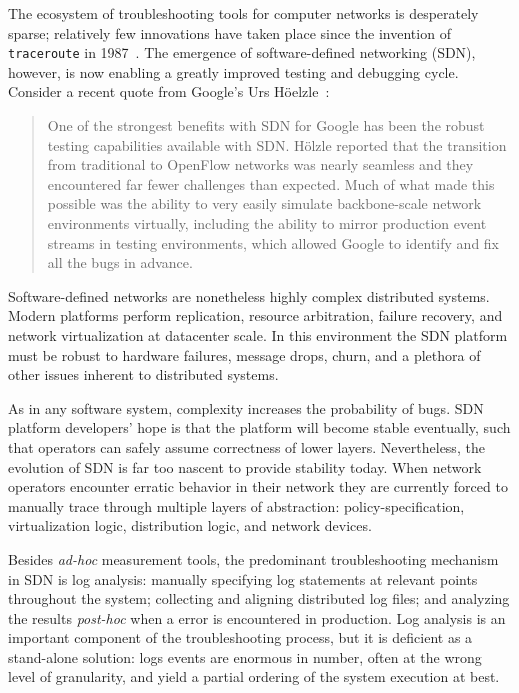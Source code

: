 The ecosystem of troubleshooting tools for computer networks is desperately
sparse; relatively few innovations have taken place since the invention of
{\tt traceroute} in 1987~\cite{traceroute}. The emergence of software-defined
networking (SDN), however, is now enabling a greatly improved testing and debugging
cycle. Consider a recent quote from Google's Urs H\"oelzle~\cite{urs}:

\begin{quote}
One of the strongest benefits with SDN for Google has been the robust
testing capabilities available with SDN. H\"olzle reported that the
transition from traditional to OpenFlow networks was nearly seamless and
they encountered far fewer challenges than expected. Much of what made
this possible was the ability to very easily simulate backbone-scale
network environments virtually, including the ability to mirror
production event streams in testing environments, which allowed Google
to identify and fix all the bugs in advance.
\end{quote}

Software-defined networks are nonetheless highly complex distributed systems.
Modern platforms perform replication, resource arbitration, failure recovery, and network 
virtualization at datacenter scale. In this environment the SDN platform must be robust to
hardware failures, message drops, churn, and a plethora of other issues
inherent to distributed systems.

As in any software system, complexity increases the probability of
bugs. SDN platform developers' hope is that the platform will become
stable eventually, such that operators can safely assume correctness of lower layers.
Nevertheless, the evolution of SDN is far too nascent to provide stability
today. When network operators encounter erratic behavior in their network
they are currently forced to manually trace through
multiple layers of abstraction: policy-specification, virtualization logic,
distribution logic, and network devices. 


Besides {\it ad-hoc} measurement tools,
the predominant troubleshooting mechanism in SDN is
log analysis: manually specifying log statements at relevant points throughout the system;
collecting and aligning distributed log files; and analyzing the
results {\it post-hoc} when a error is encountered in production. Log analysis
is an important component of the troubleshooting process, but it is deficient
as a stand-alone solution: logs events
are enormous in number, often at the wrong level of granularity,
and yield a partial ordering of the system execution at best.

